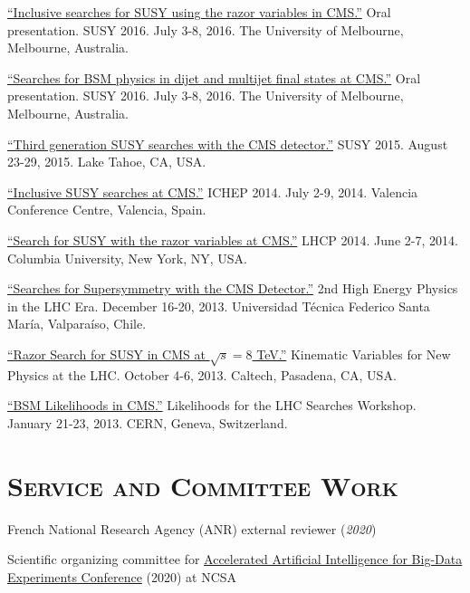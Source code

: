 \documentclass[11pt]{res}
\newcommand{\MarginText}[1]{\section{\textsc{#1}}\vspace{10pt}}
\begin{document}
\begin{resume}
\href{https://indico.cern.ch/event/443176/contributions/2148316/}{``Inclusive
    searches for SUSY using the razor variables in CMS.''} Oral
  presentation. SUSY 2016. July 3-8, 2016. The University of Melbourne,
  Melbourne, Australia.

\href{https://indico.cern.ch/event/443176/contributions/2154549/}{``Searches
    for BSM physics in dijet and multijet final states at CMS.''} Oral
  presentation. SUSY 2016. July 3-8, 2016. The University of Melbourne,
  Melbourne, Australia.

\href{https://indico.cern.ch/event/331032/contributions/1720249/}{``Third
    generation SUSY searches with the CMS detector.''} SUSY 2015. August 23-29, 2015. Lake Tahoe,
  CA, USA.

\href{https://indico.ific.uv.es/indico/contributionDisplay.py?sessionId=24&contribId=289&confId=2025}{``Inclusive
    SUSY searches at CMS.''} ICHEP 2014. July 2-9, 2014. Valencia
  Conference Centre, Valencia, Spain.

\href{https://indico.cern.ch/event/279518/contributions/634785/}{``Search
    for SUSY with the razor variables at CMS.''} LHCP 2014. June
  2-7, 2014. Columbia University, New York, NY, USA.

\href{https://indico.cern.ch/event/252857/contributions/1579321/}{``Searches
    for Supersymmetry with the CMS Detector.''} 2nd
  High Energy Physics in the LHC Era. December 16-20,
  2013. Universidad T\'{e}cnica Federico Santa Mar\'{i}a,
  Valpara\'{i}so, Chile.

\href{https://indico.cern.ch/event/261650/contributions/586374/}{``Razor
    Search for SUSY in CMS at $\sqrt{s}=8$ TeV.''} Kinematic Variables for
  New Physics at the LHC. October 4-6, 2013. Caltech, Pasadena, CA, USA.

\href{https://indico.cern.ch/event/218693/contributions/1520333/}{``BSM Likelihoods in CMS.''} Likelihoods for
    the LHC Searches Workshop. January 21-23, 2013. CERN, Geneva,
    Switzerland.



\MarginText{Service and Committee Work}

French National Research Agency (ANR) external reviewer (\textit{2020})

Scientific organizing committee for \href{http://www.ncsa.illinois.edu/Conferences/AcceleratedAINCSA/}{Accelerated Artificial Intelligence for Big-Data Experiments Conference} (2020) at NCSA


\end{resume}
\end{document}
